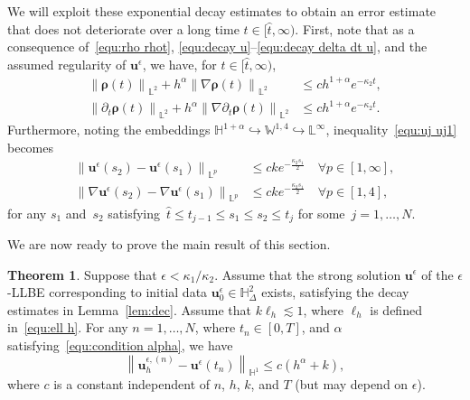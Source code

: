 \documentclass[11pt,reqno]{amsart}
\theoremstyle{definition}
\newtheorem{theorem}{Theorem}[section]
\numberwithin{equation}{section}
\newcommand{\bff}{\boldsymbol}
\newcommand{\bb}{\mathbb}
\newcommand{\leqs}{\lesssim}
\newcommand{\norm}[2]{\left\|{#1}\right\|_{#2}}
\begin{document}
We will exploit these exponential decay estimates to obtain an error estimate
that does not deteriorate over a long time $t\in [\hat{t},\infty)$. First, note
that as a consequence of~\eqref{equ:rho rhot}, 
\eqref{equ:decay u}--\eqref{equ:decay delta dt u}, and the assumed regularity of $\bff{u}^\epsilon$, we
have, for $t\in [\hat{t},\infty)$,
\begin{equation}
	\label{equ:rho et Wp}
	\begin{aligned}
	\norm{\bff{\rho}(t)}{\bb{L}^2} 
	+
	h^\alpha \norm{\nabla\bff{\rho}(t)}{\bb{L}^2}
	&\le
	c h^{1+\alpha} e^{-\kappa_2 t}, 
	\\
	\norm{\partial_t \bff{\rho}(t)}{\bb{L}^2} 
	+
	h^\alpha \norm{\nabla \partial_t \bff{\rho}(t)}{\bb{L}^2}
	&\le
	c h^{1+\alpha} e^{-\kappa_2 t}.
	\end{aligned}
\end{equation}
Furthermore, noting the embeddings $\bb{H}^{1+\alpha} \hookrightarrow \bb{W}^{1,4}\hookrightarrow \bb{L}^\infty$, inequality~\eqref{equ:uj uj1} becomes 
\begin{equation}\label{equ:u tau Lp}
	\begin{aligned}
	\norm{\bff{u}^\epsilon(s_2)-\bff{u}^\epsilon(s_1)}{\bb{L}^p}
	&\leq
	ck e^{-\frac{\kappa_2 s_1}{2}} \quad \forall p\in [1,\infty],
	\\
	\norm{\nabla\bff{u}^\epsilon(s_2)-\nabla\bff{u}^\epsilon(s_1)}{\bb{L}^{p}}
	&\leq
	ck e^{-\frac{\kappa_2 s_1}{2}} \quad \forall p\in [1,4],
	\end{aligned}
\end{equation}
for any $s_1$ and~$s_2$ satisfying~$\hat t \le t_{j-1} \le s_1\leq s_2 \le t_j$ for 
some~$j=1,\ldots,N$.

We are now ready to prove the main result of this section.
\begin{theorem}\label{the:err long}
	Suppose that $ \epsilon < \kappa_1/ \kappa_2$. Assume that the strong solution $\bff{u}^\epsilon$ of the $\epsilon$-LLBE corresponding to initial data $\bff{u}_0^\epsilon\in \bb{H}^2_\Delta$ exists, satisfying the decay estimates in Lemma~\ref{lem:dec}. Assume that $k\ell_h\leqs 1$, where $\ell_h$ is defined in~\eqref{equ:ell h}. For any $n=1,\ldots,N$, where $t_n\in [0,T]$, and $\alpha$ satisfying~\eqref{equ:condition alpha}, we have
	\[
	\norm{\bff{u}_h^{\epsilon, (n)}-\bff{u}^\epsilon(t_n)}{\bb{H}^1}
	\leq c(h^\alpha+k),
	\]
	where $c$ is a constant independent of $n$, $h$, $k$, and $T$ (but may depend on $\epsilon$).
\end{theorem}
\end{document}
